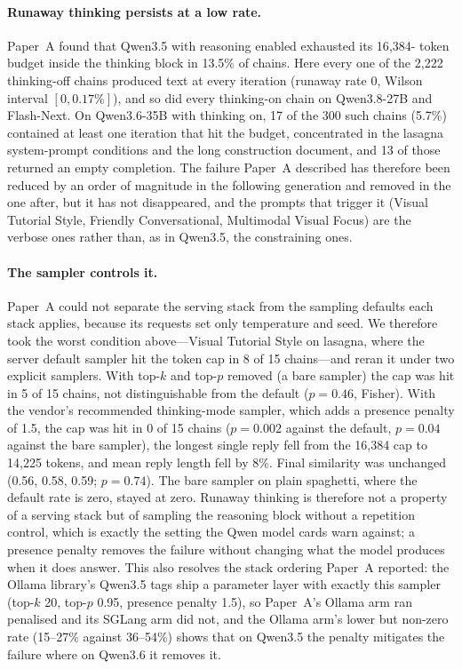 \documentclass[11pt]{article}
\begin{document}
\paragraph{Runaway thinking persists at a low rate.}
Paper~A found that Qwen3.5 with reasoning enabled exhausted its 16{,}384-
token budget inside the thinking block in 13.5\% of chains. Here every one
of the 2{,}222 thinking-off chains produced text at every iteration
(runaway rate 0, Wilson interval $[0, 0.17\%]$), and so did every
thinking-on chain on Qwen3.8-27B and Flash-Next. On Qwen3.6-35B with
thinking on, 17 of the 300 such chains (5.7\%) contained at least one
iteration that hit the budget, concentrated in the lasagna system-prompt conditions and
the long construction document, and 13 of those returned an empty
completion. The failure Paper~A described has therefore been reduced by an
order of magnitude in the following generation and removed in the one after,
but it has not disappeared, and the prompts that trigger it (Visual
Tutorial Style, Friendly Conversational, Multimodal Visual Focus) are the
verbose ones rather than, as in Qwen3.5, the constraining ones.

\paragraph{The sampler controls it.}
Paper~A could not separate the serving stack from the sampling defaults each
stack applies, because its requests set only temperature and seed. We
therefore took the worst condition above---Visual Tutorial Style on
lasagna, where the server default sampler hit the token cap in 8 of 15
chains---and reran it under two explicit samplers. With top-$k$ and top-$p$
removed (a bare sampler) the cap was hit in 5 of 15 chains, not
distinguishable from the default ($p=0.46$, Fisher). With the vendor's
recommended thinking-mode sampler, which adds a presence penalty of 1.5, the
cap was hit in 0 of 15 chains ($p=0.002$ against the default, $p=0.04$
against the bare sampler), the longest single reply fell from the 16{,}384
cap to 14{,}225 tokens, and mean reply length fell by 8\%. Final similarity
was unchanged (0.56, 0.58, 0.59; $p=0.74$). The bare sampler on plain
spaghetti, where the default rate is zero, stayed at zero. Runaway thinking
is therefore not a property of a serving stack but of sampling the reasoning
block without a repetition control, which is exactly the setting the Qwen
model cards warn against; a presence penalty removes the failure without
changing what the model produces when it does answer. This also resolves
the stack ordering Paper~A reported: the Ollama library's Qwen3.5 tags ship
a parameter layer with exactly this sampler (top-$k$ 20, top-$p$ 0.95,
presence penalty 1.5), so Paper~A's Ollama arm ran penalised and its SGLang
arm did not, and the Ollama arm's lower but non-zero rate (15--27\% against
36--54\%) shows that on Qwen3.5 the penalty mitigates the failure where on
Qwen3.6 it removes it.
\end{document}
